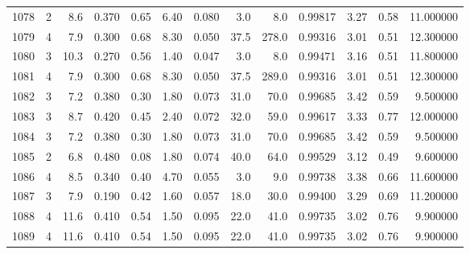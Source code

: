 \begin{tabular}{lrrrrrrrrrrrr}
1078 &        2 &            8.6 &             0.370 &         0.65 &            6.40 &      0.080 &                  3.0 &                   8.0 &  0.99817 &  3.27 &       0.58 &  11.000000 \\
1079 &        4 &            7.9 &             0.300 &         0.68 &            8.30 &      0.050 &                 37.5 &                 278.0 &  0.99316 &  3.01 &       0.51 &  12.300000 \\
1080 &        3 &           10.3 &             0.270 &         0.56 &            1.40 &      0.047 &                  3.0 &                   8.0 &  0.99471 &  3.16 &       0.51 &  11.800000 \\
1081 &        4 &            7.9 &             0.300 &         0.68 &            8.30 &      0.050 &                 37.5 &                 289.0 &  0.99316 &  3.01 &       0.51 &  12.300000 \\
1082 &        3 &            7.2 &             0.380 &         0.30 &            1.80 &      0.073 &                 31.0 &                  70.0 &  0.99685 &  3.42 &       0.59 &   9.500000 \\
1083 &        3 &            8.7 &             0.420 &         0.45 &            2.40 &      0.072 &                 32.0 &                  59.0 &  0.99617 &  3.33 &       0.77 &  12.000000 \\
1084 &        3 &            7.2 &             0.380 &         0.30 &            1.80 &      0.073 &                 31.0 &                  70.0 &  0.99685 &  3.42 &       0.59 &   9.500000 \\
1085 &        2 &            6.8 &             0.480 &         0.08 &            1.80 &      0.074 &                 40.0 &                  64.0 &  0.99529 &  3.12 &       0.49 &   9.600000 \\
1086 &        4 &            8.5 &             0.340 &         0.40 &            4.70 &      0.055 &                  3.0 &                   9.0 &  0.99738 &  3.38 &       0.66 &  11.600000 \\
1087 &        3 &            7.9 &             0.190 &         0.42 &            1.60 &      0.057 &                 18.0 &                  30.0 &  0.99400 &  3.29 &       0.69 &  11.200000 \\
1088 &        4 &           11.6 &             0.410 &         0.54 &            1.50 &      0.095 &                 22.0 &                  41.0 &  0.99735 &  3.02 &       0.76 &   9.900000 \\
1089 &        4 &           11.6 &             0.410 &         0.54 &            1.50 &      0.095 &                 22.0 &                  41.0 &  0.99735 &  3.02 &       0.76 &   9.900000 \\

\end{tabular}

